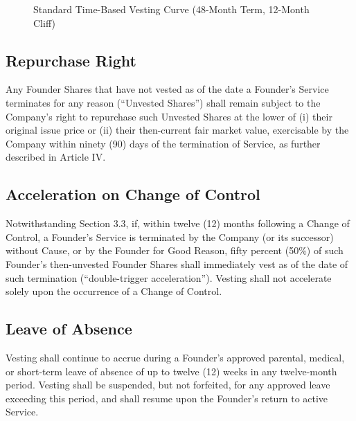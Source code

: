 \begin{figure}[h]
\centering
{}
\caption{Standard Time-Based Vesting Curve (48-Month Term, 12-Month Cliff)}
\label{fig:vesting_curve}
\end{figure}

\subsection{Repurchase Right} Any Founder Shares that have not vested as of the date a Founder's Service terminates for any reason (``Unvested Shares'') shall remain subject to the Company's right to repurchase such Unvested Shares at the lower of (i) their original issue price or (ii) their then-current fair market value, exercisable by the Company within ninety (90) days of the termination of Service, as further described in Article IV.

\subsection{Acceleration on Change of Control} Notwithstanding Section 3.3, if, within twelve (12) months following a Change of Control, a Founder's Service is terminated by the Company (or its successor) without Cause, or by the Founder for Good Reason, fifty percent (50\%) of such Founder's then-unvested Founder Shares shall immediately vest as of the date of such termination (``double-trigger acceleration''). Vesting shall not accelerate solely upon the occurrence of a Change of Control.

\subsection{Leave of Absence} Vesting shall continue to accrue during a Founder's approved parental, medical, or short-term leave of absence of up to twelve (12) weeks in any twelve-month period. Vesting shall be suspended, but not forfeited, for any approved leave exceeding this period, and shall resume upon the Founder's return to active Service.

